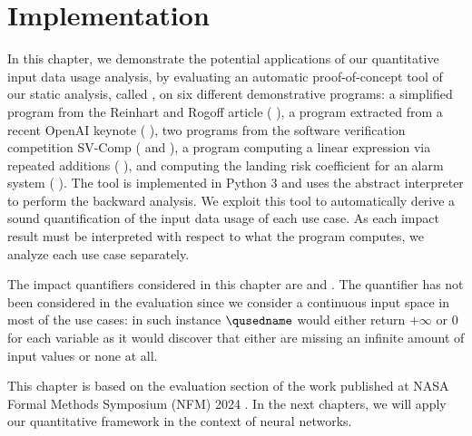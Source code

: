 \setchapterpreamble[u]{\margintoc}

\chapter{Implementation}


In this chapter, we demonstrate the potential applications of our quantitative input data usage analysis, by evaluating an automatic proof-of-concept tool of our static analysis, called \impatto\sidenotemark[\ref{impatto}], on six different demonstrative programs:
a simplified program from the Reinhart and Rogoff article (\cf{} ),
a program extracted from a recent OpenAI keynote (\cf{} ),
two programs from the software verification competition SV-Comp (\cf{}  and ),
a program computing a linear expression via repeated additions (\cf{} ),
and  computing the landing risk coefficient for an alarm system (\cf{} ).
The tool \impatto{} is implemented in Python 3 and uses the \interproc\sidenotemark[\ref{interproc}] abstract interpreter to perform the backward analysis.
We exploit this tool to automatically derive a sound quantification of the input data usage of each use case.
As each impact result must be interpreted with respect to what the program computes, we analyze each use case separately.

The impact quantifiers considered in this chapter are \outcomesname{} and \rangename{}.
The \qusedname{} quantifier has not been considered in the evaluation since we consider a continuous input space in most of the use cases: in such instance $\qusedname$ would either return $+\infty$ or $0$ for each variable as it would discover that either are missing an infinite amount of input values or none at all.

This chapter is based on the evaluation section of the work published at NASA Formal Methods Symposium (NFM) 2024 . In the next chapters, we will apply our quantitative framework in the context of neural networks.


\frenchdiv

